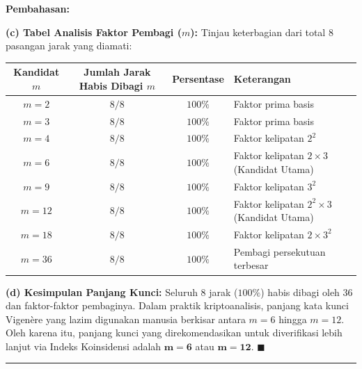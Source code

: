 \documentclass[11pt,a4paper]{article}
\newenvironment{solusi}{\noindent\textbf{\textsf{Pembahasan:}}\par\vspace{0.2em}}{\hfill$\blacksquare$\vspace{1em}\par\hrule\vspace{1em}}
\begin{document}
\begin{solusi}
\vspace{0.2cm}
\textbf{(c) Tabel Analisis Faktor Pembagi ($m$):}
Tinjau keterbagian dari total 8 pasangan jarak yang diamati:
\begin{center}
\begin{tabular}{c c c l}
\toprule
\textbf{Kandidat $m$} & \textbf{Jumlah Jarak Habis Dibagi $m$} & \textbf{Persentase} & \textbf{Keterangan} \\
\midrule
$m = 2$  & $8 / 8$ & $100\%$ & Faktor prima basis \\
$m = 3$  & $8 / 8$ & $100\%$ & Faktor prima basis \\
$m = 4$  & $8 / 8$ & $100\%$ & Faktor kelipatan $2^2$ \\
$m = 6$  & $8 / 8$ & $100\%$ & Faktor kelipatan $2 \times 3$ (Kandidat Utama) \\
$m = 9$  & $8 / 8$ & $100\%$ & Faktor kelipatan $3^2$ \\
$m = 12$ & $8 / 8$ & $100\%$ & Faktor kelipatan $2^2 \times 3$ (Kandidat Utama) \\
$m = 18$ & $8 / 8$ & $100\%$ & Faktor kelipatan $2 \times 3^2$ \\
$m = 36$ & $8 / 8$ & $100\%$ & Pembagi persekutuan terbesar \\
\bottomrule
\end{tabular}
\end{center}

\vspace{0.2cm}
\textbf{(d) Kesimpulan Panjang Kunci:}
Seluruh 8 jarak ($100\%$) habis dibagi oleh 36 dan faktor-faktor pembaginya. Dalam praktik kriptoanalisis, panjang kata kunci Vigenère yang lazim digunakan manusia berkisar antara $m = 6$ hingga $m = 12$. Oleh karena itu, panjang kunci yang direkomendasikan untuk diverifikasi lebih lanjut via Indeks Koinsidensi adalah $\mathbf{m = 6}$ atau $\mathbf{m = 12}$.
\end{solusi}

\end{document}
